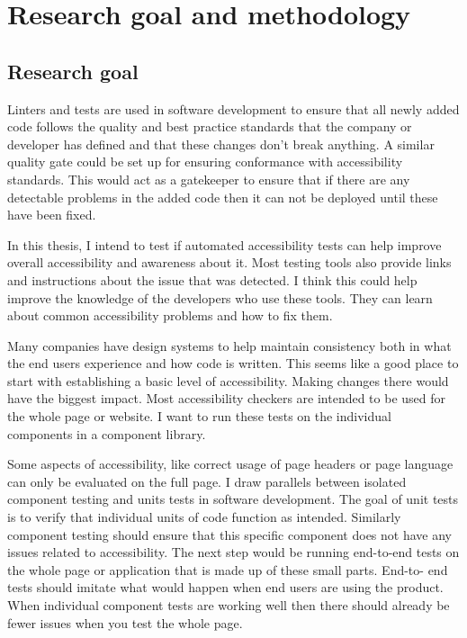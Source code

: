 \documentclass{master_thesis}
\begin{document}
\section{Research goal and methodology}
\subsection{Research goal}

Linters and tests are used in software development to ensure that all newly added code follows the quality and best practice standards that the company or developer has defined and that these changes don't break anything. A similar quality gate could be set up for ensuring conformance with accessibility standards. This would act as a gatekeeper to ensure that if there are any detectable problems in the added code then it can not be deployed until these have been fixed.

In this thesis, I intend to test if automated accessibility tests can help improve overall accessibility and awareness about it. Most testing tools also provide links and instructions about the issue that was detected. I think this could help improve the knowledge of the developers who use these tools. They can learn about common accessibility problems and how to fix them.

Many companies have design systems to help maintain consistency both in what the end users experience and how code is written. This seems like a good place to start with establishing a basic level of accessibility. Making changes there would have the biggest impact. Most accessibility checkers are intended to be used for the whole page or website. I want to run these tests on the individual components in a component library.

Some aspects of accessibility, like correct usage of page headers or page language can only be evaluated on the full page. I draw parallels between isolated component testing and units tests in software development. The goal of unit tests is to verify that individual units of code function as intended. Similarly component testing should ensure that this specific component does not have any issues related to accessibility. The next step  would be running end-to-end tests on the whole page or application that is made up of these small parts. End-to- end tests should imitate what would happen when end users are using the product. When individual component tests are working well then there should already be fewer issues when you test the whole page. 
\end{document}
